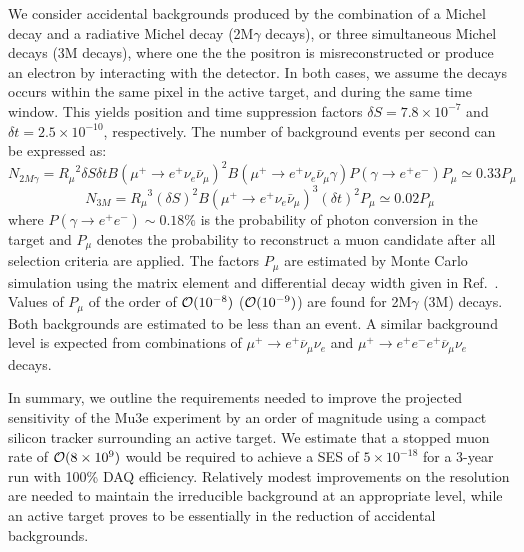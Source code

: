 We consider accidental backgrounds produced by the combination of a Michel decay and a radiative Michel decay (2M$\gamma$ decays), or three simultaneous Michel decays (3M decays), where one the the positron is misreconstructed or produce an electron by interacting with the detector. In both cases, we assume the decays occurs within the same pixel in the active target, and during the same time window. This yields position and time suppression factors $\delta S = 7.8\times 10^{-7}$ and $\delta t = 2.5\times 10^{-10}$, respectively. The number of background events per second can be expressed as:
%
$$N_{2M\gamma} = {R_\mu}^2 \delta S \delta t {B(\mu^+ \rightarrow e^+ \nu_e \bar\nu_\mu)}^2 B(\mu^+ \rightarrow e^+ \nu_e \bar\nu_\mu \gamma) P(\gamma \rightarrow e^+ e^-)  P_\mu  \simeq 0.33 P_\mu$$
$$N_{3M} = {R_\mu}^3(\delta S)^2 {B(\mu^+ \rightarrow e^+ \nu_e \bar\nu_\mu)}^3 (\delta t)^2 P_\mu \simeq 0.02 P_\mu$$
%
where $P(\gamma \rightarrow e^+ e^-)\sim 0.18\%$ is the probability of photon conversion in the target and $P_\mu$ denotes the probability to reconstruct a muon candidate after all selection criteria are applied. The factors $P_\mu$ are estimated by Monte Carlo simulation using the matrix element and differential decay width given in Ref.~\cite{Kuno:1999jp,Djilkibaev:2008jy}. Values of $P_\mu$ of the order of ${\cal O}(10^{-8})$ (${\cal O}(10^{-9})$) are found for 2M$\gamma$ (3M) decays. Both backgrounds are estimated to be less than an event. A similar background level is expected from combinations of $\mu^+ \rightarrow e^+ \overline{\nu}_{\mu} \nu_e$ and $\mu^+ \rightarrow e^+e^-e^+ \overline{\nu}_{\mu} \nu_e$ decays. 

In summary, we outline the requirements needed to improve the projected sensitivity of the Mu3e experiment by an order of magnitude using a compact silicon tracker surrounding an active target. We estimate that a stopped muon rate of ${\cal O}(8\times 10^{9})$ would be required to achieve a SES of $5\times 10^{-18}$ for a 3-year run with 100\% DAQ efficiency. Relatively modest improvements on the resolution are needed to maintain the irreducible background at an appropriate level, while an active target proves to be essentially in the reduction of accidental backgrounds. 


